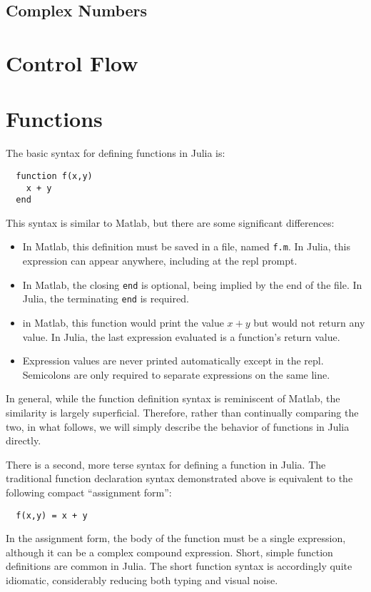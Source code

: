 \documentclass{article}
\begin{document}
\subsection{Complex Numbers}

\section{Control Flow}



\section{Functions}

The basic syntax for defining functions in Julia is:
\begin{verbatim}
  function f(x,y)
    x + y
  end
\end{verbatim}
This syntax is similar to Matlab, but there are some significant differences:
\begin{itemize}
\item In Matlab, this definition must be saved in a file, named \verb|f.m|.
In Julia, this expression can appear anywhere, including at the repl prompt.
\item In Matlab, the closing \verb|end| is optional, being implied by the end of the file.
In Julia, the terminating \verb|end| is required.
\item in Matlab, this function would print the value $x + y$ but would not return any value.
In Julia, the last expression evaluated is a function's return value.
\item Expression values are never printed automatically except in the repl.
Semicolons are only required to separate expressions on the same line.
\end{itemize}
In general, while the function definition syntax is reminiscent of Matlab, the similarity is largely superficial.
Therefore, rather than continually comparing the two, in what follows, we will simply describe the behavior of functions in Julia directly.

There is a second, more terse syntax for defining a function in Julia.
The traditional function declaration syntax demonstrated above is equivalent to the following compact ``assignment form'':
\begin{verbatim}
  f(x,y) = x + y
\end{verbatim}
In the assignment form, the body of the function must be a single expression, although it can be a complex compound expression.
Short, simple function definitions are common in Julia.
The short function syntax is accordingly quite idiomatic, considerably reducing both typing and visual noise.
\end{document}

